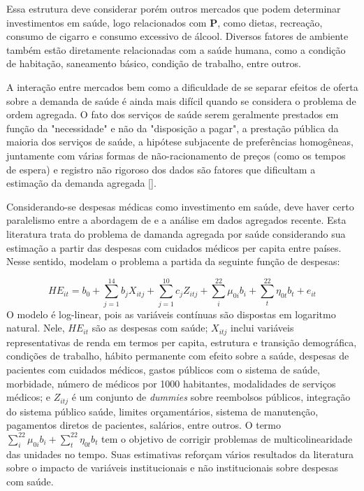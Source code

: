 \documentclass[twoside,onecolumn,12pt]{article}
\numberwithin{outputctr}{section}
\begin{document}
Essa estrutura deve considerar por\'{e}m outros mercados que podem determinar investimentos em sa\'{u}de, logo relacionados com $\textbf{P}$, como dietas, recrea\c{c}\~{a}o, consumo de cigarro e consumo excessivo de \'{a}lcool. Diversos fatores de ambiente tamb\'{e}m est\~{a}o diretamente relacionadas com a sa\'{u}de humana, como a condi\c{c}\~{a}o de habita\c{c}\~{a}o, saneamento b\'{a}sico, condi\c{c}\~{a}o de trabalho, entre outros.

A interação entre mercados bem como a dificuldade de se separar efeitos de oferta sobre a demanda de saúde é ainda mais difícil quando se considera o problema de ordem agregada. O fato dos serviços de saúde serem geralmente prestados em função da "necessidade" e não da "disposição a pagar", a prestação pública da maioria dos serviços de saúde, a hipótese subjacente de preferências homogêneas, juntamente com várias formas de não-racionamento de preços (como os tempos de espera) e registro não rigoroso dos dados são fatores que dificultam a estimação da demanda agregada [].

Considerando-se despesas médicas como investimento em saúde, deve haver certo paralelismo entre a abordagem de  e a análise em dados agregados recente. Esta literatura trata do problema de damanda agregada por saúde considerando sua estimação a partir das despesas com cuidados médicos per capita entre países. Nesse sentido,  modelam o problema a partida da seguinte função de despesas: 

\begin{equation}
HE_{it} = b_0 + \sum_{j = 1}^{14}{ b_{j} X_{itj} } + \sum_{j = 1}^{10}{ c_{j} Z_{itj} } + \sum_{i}^{22}{\mu_{0i}b_{i}} + \sum_{t}^{22}{\eta_{0t}b_{t}} + e_{it}
\end{equation}
O modelo é log-linear, pois as variáveis contínuas são dispostas em logaritmo natural. Nele, $HE_{it}$ são as despesas com saúde; $X_{itj}$ inclui variáveis representativas de renda em termos per capita, estrutura e transição demográfica, condições de trabalho, hábito permanente com efeito sobre a saúde, despesas de pacientes com cuidados médicos, gastos públicos com o sistema de saúde, morbidade, número de médicos por 1000 habitantes, modalidades de serviços médicos; e $Z_{itj}$ é um conjunto de \textit{dummies} sobre reembolsos públicos, integração do sistema público saúde, limites orçamentários, sistema de manutenção, pagamentos diretos de pacientes, salários, entre outros. O termo $\sum_{i}^{22}{\mu_{0i}b_{i}} + \sum_{t}^{22}{\eta_{0t}b_{t}}$ tem o objetivo de corrigir problemas de multicolinearidade das unidades no tempo. Suas estimativas reforçam vários resultados da literatura sobre o impacto de variáveis institucionais e não institucionais sobre despesas com saúde.
\end{document}
